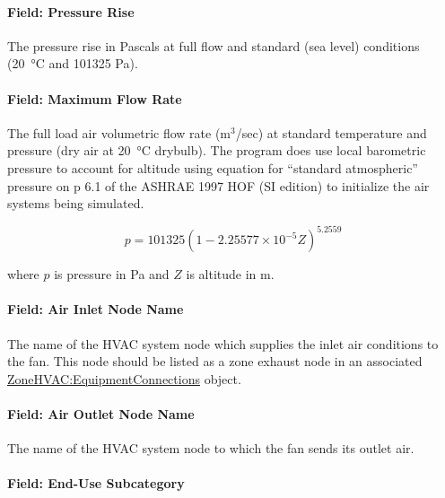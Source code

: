 \paragraph{Field: Pressure Rise}\label{field-pressure-rise-3}

The pressure rise in Pascals at full flow and standard (sea level) conditions (\SI{20}{\celsius} and 101325 Pa).

\paragraph{Field: Maximum Flow Rate}\label{field-maximum-flow-rate-3}

The full load air volumetric flow rate (m\(^{3}\)/sec) at standard temperature and pressure (dry air at \SI{20}{\celsius} drybulb). The program does use local barometric pressure to account for altitude using equation for ``standard atmospheric'' pressure on p 6.1 of the ASHRAE 1997 HOF (SI edition) to initialize the air systems being simulated.

\begin{equation}
p = 101325 \left(1 - 2.25577 \times 10^{-5} Z\right)^{5.2559}
\end{equation}

where \(p\) is pressure in Pa and \(Z\) is altitude in m.

\paragraph{Field: Air Inlet Node Name}\label{field-air-inlet-node-name-3-000}

The name of the HVAC system node which supplies the inlet air conditions to the fan. This node should be listed as a zone exhaust node in an associated \hyperref[zonehvacequipmentconnections]{ZoneHVAC:EquipmentConnections} object.

\paragraph{Field: Air Outlet Node Name}\label{field-air-outlet-node-name-3-000}

The name of the HVAC system node to which the fan sends its outlet air.

\paragraph{Field: End-Use Subcategory}\label{field-end-use-subcategory-3}

